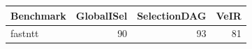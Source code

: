     \centering
    \footnotesize
    \begin{tabular}{l r r r }
        \toprule
        \textbf{Benchmark} & \textbf{GlobalISel} & \textbf{SelectionDAG} & \textbf{VeIR} \\
        \midrule
        fastntt & 90 & 93 & 81 \\
        \bottomrule
    \end{tabular}
    \caption{\#instructions per iteration.}
    \label{tab:real-instructions}
